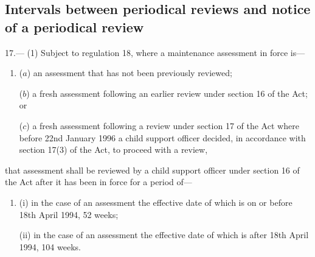 \documentclass[a4paper]{article}
\newcommand{\parthead}{}
\begin{document}
\renewcommand\parthead{--- Part V}

\subsection[17. Intervals between periodical reviews and notice of a periodical review]{Intervals between periodical reviews and notice of a periodical review}

17.—%
%
%
(1) Subject to 
regulation 18,  %
where a maintenance assessment in force is---
\begin{enumerate}\item[]
($a$) an assessment that has not been previously reviewed;

($b$) a fresh assessment following an earlier review under section 16 of the Act; or

($c$) a fresh assessment following a review under section 17 of the Act
where before 22nd January 1996 a child support officer decided, in accordance with section 17(3) of the Act, to proceed with a review,  %
\end{enumerate}
that assessment shall be reviewed by a child support officer under section 16 of the Act 
after it has been in force for a period of—
\begin{enumerate}\item[]
(i) in the case of an assessment the effective date of which is on or before 18th April 1994, 52 weeks;

(ii) in the case of an assessment the effective date of which is after 18th April 1994, 104 weeks.
\end{enumerate}  %

\end{document}
